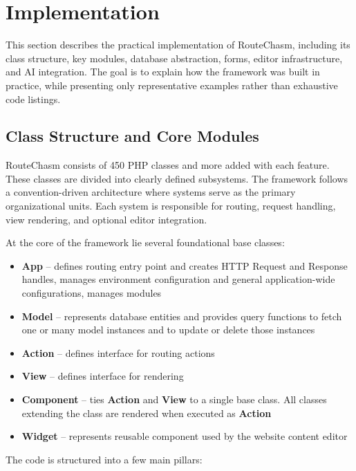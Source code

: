 \section{Implementation}\label{sec:implementation}
This section describes the practical implementation of RouteChasm, including its
class structure, key modules, database abstraction, forms, editor infrastructure,
and AI integration.
The goal is to explain how the framework was built in practice,
while presenting only representative examples rather than exhaustive code listings.

\subsection{Class Structure and Core Modules}\label{subsec:class-structure-and-core-modules}
RouteChasm consists of 450 PHP classes and more added with each feature. These classes are divided into clearly defined
subsystems.
The framework follows a convention-driven architecture where systems serve as the primary organizational units.
Each system is responsible for routing, request handling, view rendering, and optional editor integration.

At the core of the framework lie several foundational base classes:

\begin{itemize}
    \item \textbf{App} -- defines routing entry point and creates HTTP Request and Response handles, manages environment
        configuration and general application-wide configurations, manages modules
    \item \textbf{Model} -- represents database entities and provides query functions to fetch one or many model
        instances and to update or delete those instances
    \item \textbf{Action} -- defines interface for routing actions
    \item \textbf{View} -- defines interface for rendering
    \item \textbf{Component} -- ties \textbf{Action} and \textbf{View} to a single base class. All classes extending
        the class are rendered when executed as \textbf{Action}
    \item \textbf{Widget} -- represents reusable component used by the website content editor
\end{itemize}

The code is structured into a few main pillars:

